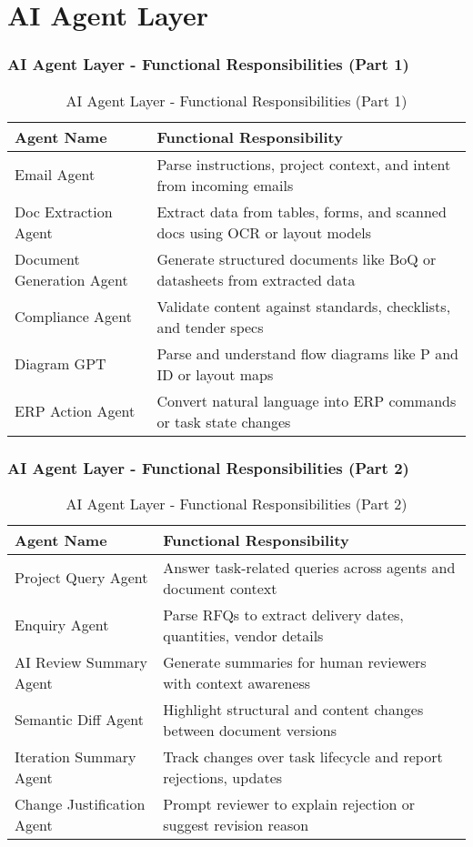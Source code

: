 \section{AI Agent Layer}

\begin{frame}
    \frametitle{AI Agent Layer - Functional Responsibilities (Part 1)}
    \begin{table}[h!]
\centering
\renewcommand{\arraystretch}{1.2}
\begin{tabular}{|p{3cm}|p{7cm}|}
\hline
\textbf{Agent Name} & \textbf{Functional Responsibility} \\
\hline
Email Agent & Parse instructions, project context, and intent from incoming emails \\
\hline
Doc Extraction Agent & Extract data from tables, forms, and scanned docs using OCR or layout models \\
\hline
Document Generation Agent & Generate structured documents like BoQ or datasheets from extracted data \\
\hline
Compliance Agent & Validate content against standards, checklists, and tender specs \\
\hline
Diagram GPT & Parse and understand flow diagrams like P and ID or layout maps \\
\hline
ERP Action Agent & Convert natural language into ERP commands or task state changes \\
\hline
\end{tabular}
\caption{AI Agent Layer - Functional Responsibilities (Part 1)}
\end{table}
\end{frame}

\begin{frame}
    \frametitle{AI Agent Layer - Functional Responsibilities (Part 2)}
    \begin{table}[h!]
\centering
\renewcommand{\arraystretch}{1.2}
\begin{tabular}{|p{3cm}|p{7cm}|}
\hline
\textbf{Agent Name} & \textbf{Functional Responsibility} \\
\hline
Project Query Agent & Answer task-related queries across agents and document context \\
\hline
Enquiry Agent & Parse RFQs to extract delivery dates, quantities, vendor details \\
\hline
AI Review Summary Agent & Generate summaries for human reviewers with context awareness \\
\hline
Semantic Diff Agent & Highlight structural and content changes between document versions \\
\hline
Iteration Summary Agent & Track changes over task lifecycle and report rejections, updates \\
\hline
Change Justification Agent & Prompt reviewer to explain rejection or suggest revision reason \\
\hline
\end{tabular}
\caption{AI Agent Layer - Functional Responsibilities (Part 2)}
\end{table}
\end{frame}


